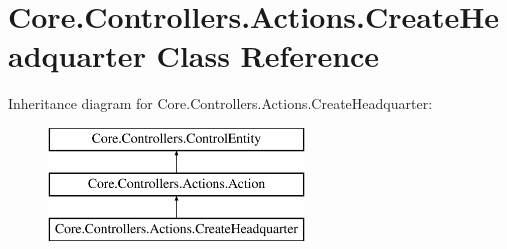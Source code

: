 \hypertarget{classCore_1_1Controllers_1_1Actions_1_1CreateHeadquarter}{\section{Core.\-Controllers.\-Actions.\-Create\-Headquarter Class Reference}
\label{classCore_1_1Controllers_1_1Actions_1_1CreateHeadquarter}
}
Inheritance diagram for Core.\-Controllers.\-Actions.\-Create\-Headquarter\-:\begin{figure}[H]
\begin{center}
\leavevmode
\includegraphics[height=3.000000cm]{classCore_1_1Controllers_1_1Actions_1_1CreateHeadquarter}
\end{center}
\end{figure}
